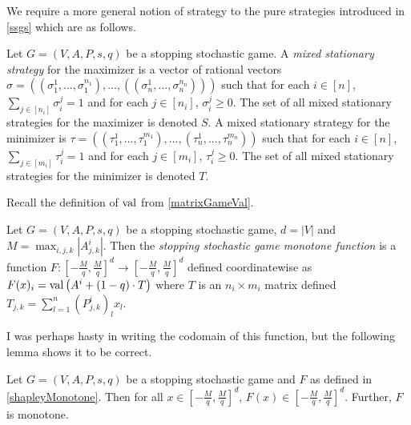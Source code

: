 We require a more general notion of strategy to the pure strategies introduced in \cref{ssgs} which
are as follows.
\begin{definition}
  Let $G = (V, A, P, s, q)$ be a stopping stochastic game. A \emph{mixed stationary strategy}
  for the maximizer is a vector of rational vectors 
  $\sigma = ((\sigma_1^{1}, ..., \sigma_1^{n_1}), ..., ((\sigma_n^{1}, ..., \sigma_n^{n_n})))$ such
  that for each $i \in [n]$, $\sum_{j \in [n_i]} \sigma_i^j = 1$ and for each $j \in [n_i]$, $\sigma_i^j \geq 0$.
  The set of all mixed stationary strategies for the maximizer is denoted $S$.
  A mixed stationary strategy for the minimizer is 
  $\tau = ((\tau_1^{1}, ..., \tau_1^{m_1}), ..., (\tau_n^{1}, ..., \tau_n^{m_n}))$
  such that for each $i \in [n]$, $\sum_{j \in [m_i]} \tau_i^j = 1$ 
  and for each $j \in [m_i]$, $\tau_i^j \geq 0$.
  The set of all mixed stationary strategies for the minimizer is denoted $T$.
\end{definition}
Recall the definition of $\mathrm{val}$ from \cref{matrixGameVal}.
\begin{definition} \label{shapleyMonotone}
  Let $G = (V, A, P, s, q)$ be a stopping stochastic game, $d = |V|$ and $M = \max_{i, j, k} |A_{j, k}^i|$. Then the
  \emph{stopping stochastic game monotone function} is a function
  $F : [-\frac{M}{q}, \frac{M}{q}]^d \to [-\frac{M}{q}, \frac{M}{q}]^d$ defined coordinatewise as
  $F(x)_i =  \mathrm{val} \left( A^i + (1 - q) \cdot T \right)$ where $T$ is an $n_i \times m_i$ matrix defined
  $T_{j, k} = \sum_{l = 1}^n (P_{j, k}^i)_l x_l$.
\end{definition}
I was perhaps hasty in writing the codomain of this function, but the following lemma
shows it to be correct.
\begin{lemma}
  Let $G = (V, A, P, s, q)$ be a stopping stochastic game and $F$ as defined in \cref{shapleyMonotone}.
  Then for all $x \in [-\frac{M}{q}, \frac{M}{q}]^d$, $F(x) \in [-\frac{M}{q}, \frac{M}{q}]^d$.
  Further, $F$ is monotone.
\end{lemma}
\newcommand{\mat}{\mathrm{Mat}}
